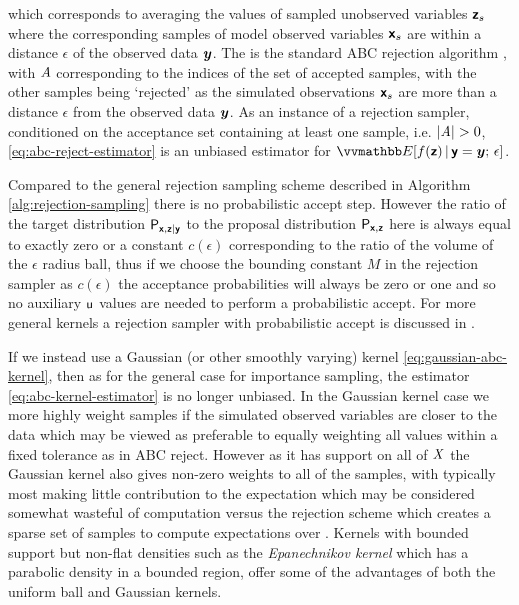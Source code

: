 which corresponds to averaging the values of sampled unobserved variables $\boldsymbol{\mathsf{z}}_s$ where the corresponding samples of model observed variables $\boldsymbol{\mathsf{x}}_s$ are within a distance $\epsilon$ of the observed data $\boldsymbol{y}$. The is the standard \ac{ABC} rejection algorithm \citep{rubin1984bayesianly,tavare1997inferring,fu1997estimating,weiss1998inference,pritchard1999population} , with $\mathit{A}$ corresponding to the indices of the set of accepted samples, with the other samples being `rejected' as the simulated observations $\boldsymbol{\mathsf{x}}_s$ are more than a distance $\epsilon$ from the observed data $\boldsymbol{y}$. As an instance of a rejection sampler, conditioned on the acceptance set containing at least one sample, i.e. $|\mathit{A}| > 0$, \eqref{eq:abc-reject-estimator} is an unbiased estimator for $\expc{f(\rvct{z}) \gvn \rvct{y} = \vct{y};\,\epsilon}$. 

Compared to the general rejection sampling scheme described in Algorithm \ref{alg:rejection-sampling} there is no probabilistic accept step. However the ratio of the target distribution $\mathsf{P}_{\boldsymbol{\mathsf{x}},\boldsymbol{\mathsf{z}}|\boldsymbol{\mathsf{y}}}$ to the proposal distribution $\mathsf{P}_{\boldsymbol{\mathsf{x}},\boldsymbol{\mathsf{z}}}$ here is always equal to exactly zero or a constant $c(\epsilon)$ corresponding to the ratio of the volume of the $\epsilon$ radius ball, thus if we choose the bounding constant $M$ in the rejection sampler as $c(\epsilon)$ the acceptance probabilities will always be zero or one and so no auxiliary $\mathsf{u}$ values are needed to perform a probabilistic accept. For more general kernels a rejection sampler with probabilistic accept is discussed in \citep{wilkinson2013approximate}.

If we instead use a Gaussian (or other smoothly varying) kernel \eqref{eq:gaussian-abc-kernel}, then as for the general case for importance sampling, the estimator \eqref{eq:abc-kernel-estimator} is no longer unbiased. In the Gaussian kernel case we more highly weight samples if the simulated observed variables are closer to the data which may be viewed as preferable to equally weighting all values within a fixed tolerance as in \ac{ABC} reject. However as it has support on all of $\mathit{X}$ the Gaussian kernel also gives non-zero weights to all of the samples, with typically most making little contribution to the expectation which may be considered somewhat wasteful of computation versus the rejection scheme which creates a sparse set of samples to compute expectations over \citep{beaumont2002approximate}. Kernels with bounded support but non-flat densities such as the \emph{Epanechnikov kernel} \citep{epanechnikov1969non} which has a parabolic density in a bounded region, offer some of the advantages of both the uniform ball and Gaussian kernels.

